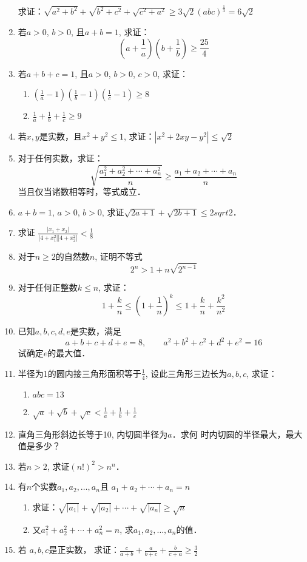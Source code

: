 \begin{enumerate}
求证：$\sqrt{a^2+b^2}+\sqrt{b^2+c^2}+\sqrt{c^2+a^2}\ge 3\sqrt{2}(abc)^{\tfrac{1}{3}}=6\sqrt{2}$

\item 若$a>0$, $b>0$, 且$a+b=1$, 
求证：\[\left(a+\frac{1}{a}\right)\left(b+\frac{1}{b}\right)\ge \frac{25}{4}\]

\item 若$a+b+c=1$, 且$a>0$, $b>0$, $c>0$, 求证：
\begin{enumerate}
    \item $\left(\frac{1}{a}-1\right)\left(\frac{1}{b}-1\right)\left(\frac{1}{c}-1\right)\ge 8$
    \item $\frac{1}{a}+\frac{1}{b}+\frac{1}{c}\ge 9$
\end{enumerate}

\item 若$x,y$是实数，且$x^2+y^2\le 1$,
求证：$|x^2+2xy-y^2|\le \sqrt{2}$

\item 对于任何实数，求证：
\[\sqrt{\frac{a_1^2+a_2^2+\cdots+a_n^2}{n}}\ge \frac{a_1+a_2+\cdots+a_n}{n}\]
当且仅当诸数相等时，等式成立．
\item $a+b=1$, $a>0$, $b>0$, 求证$\sqrt{2a+1}+\sqrt{2b+1}\le 2sqrt{2}$．
\item 求证
$\frac{|x_1+x_2|}{|4+x_1^2| |4+x_2^2|}<\frac{1}{8}$
\item 对于$n\ge 2$的自然数$n$, 证明不等式
$$2^n>1+n\sqrt{2^{n-1}}$$
\item 对于任何正整数$k\le n$, 求证：
\[1+\frac{k}{n}\le \left(1+\frac{1}{n}\right)^k\le 1+\frac{k}{n}+\frac{k^2}{n^2}\]
\item 已知$a,b,c,d,e$是实数，满足
\[a+b+c+d+e=8,\qquad a^2+b^2+c^2+d^2+e^2=16\]
试确定$e$的最大值．
\item 半径为1的圆内接三角形面积等于$\frac{1}{4}$,
设此三角形三边长为$a,b,c$, 求证：
\begin{enumerate}
    \item $abc=13$
    \item $\sqrt{a}+\sqrt{b}+\sqrt{c}<\frac{1}{a}+\frac{1}{b}+\frac{1}{c}$
\end{enumerate}

\item 直角三角形斜边长等于10, 内切圆半径为$a$．求何
时内切圆的半径最大，最大值是多少？
\item 若$n>2$, 求证$(n!)^2>n^n$．
\item 有$n$个实数$a_1,a_2,\ldots,a_n$且
$a_1+a_2+\cdots+a_n=n$
\begin{enumerate}
    \item 求证：$\sqrt{|a_1|}+\sqrt{|a_2|}+\cdots+\sqrt{|a_n|}\ge \sqrt{n}$
    \item 又$a^2_1+a_2^2+\cdots+a^2_n=n$, 
求$a_1,a_2,\ldots,a_n$的值．
\end{enumerate}

\item 若 $a,b,c$是正实数，
求证：$\frac{c}{a+b}+\frac{a}{b+c}+\frac{b}{c+a}\ge \frac{3}{2}$
\end{enumerate}


